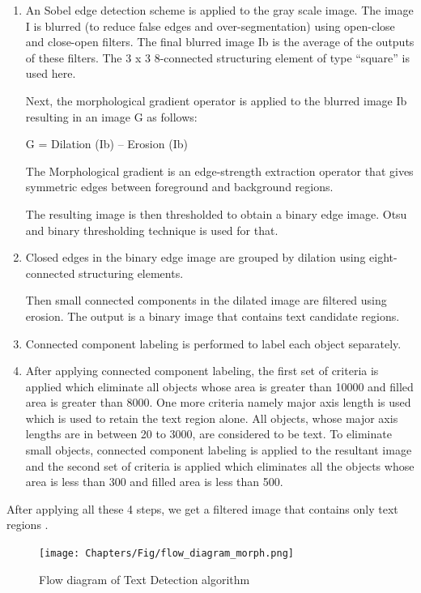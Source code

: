 \begin{enumerate}
	\item An Sobel edge detection scheme is applied to the gray scale image. The image I is blurred (to reduce false edges and over-segmentation) using open-close and close-open filters.
	The final blurred image Ib is the average of the outputs of these filters. The 3 x 3 8-connected structuring element of type ``square'' is used here.

	Next, the morphological gradient operator \nocite{morph} is applied to the blurred image Ib resulting in an image G as follows:
	\begin{center}
	G = Dilation (Ib) – Erosion (Ib)
	\end{center}

	The Morphological gradient is an edge-strength extraction operator that gives symmetric edges between foreground and background regions.

	The resulting image is then thresholded to obtain a binary edge image. Otsu and binary thresholding technique is used
	for that. \nocite{otsu}

	\item Closed edges in the binary edge image are grouped by dilation using eight- connected structuring elements.

	Then small connected components in the dilated image are filtered using erosion. The output is a binary image
	that contains text candidate regions.

	\item Connected component labeling is performed to label each object separately.

	\item After applying connected component labeling, the first set of criteria is applied which eliminate all objects whose area is greater than 10000 and filled area is greater than 8000.
	One more criteria namely major axis length is used which is used to retain the text region alone.
	All objects, whose major axis lengths are in between 20 to 3000, are considered to be text.
	To eliminate small objects, connected component labeling is applied to the resultant image and the second set of criteria is applied which eliminates all the objects whose area is less than 300 and filled area is less than 500.
\end{enumerate}

After applying all these 4 steps, we get a filtered image that contains only text regions \cite{text_detect}.

	\begin{figure}[H]
		\centering
		\texttt{[image: Chapters/Fig/flow\_diagram\_morph.png]}
		\caption{Flow diagram of Text Detection algorithm}
		\label{fig:flow_diagram_morph}
	\end{figure}


